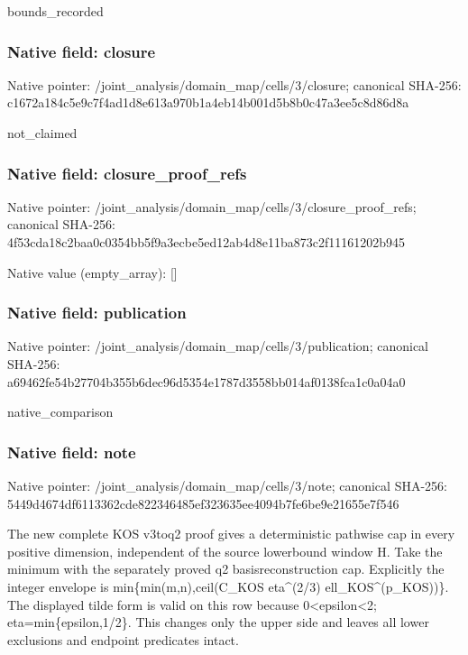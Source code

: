\documentclass[10pt,a4paper]{article}
\begin{document}
bounds\_recorded


\subsubsection{Native field: closure}


Native pointer: /joint\_analysis/domain\_m\allowbreak{}ap/cells/3/closure; canonical SHA-256: c1672a184c5e9c7f4ad1d8e6\allowbreak{}13a970b1a4eb14b001d5b8b0\allowbreak{}c47a3ee5c8d86d8a


not\_claimed


\subsubsection{Native field: closure\_proof\_refs}


Native pointer: /joint\_analysis/domain\_m\allowbreak{}ap/cells/3/closure\_proof\allowbreak{}\_refs; canonical SHA-256: 4f53cda18c2baa0c0354bb5f\allowbreak{}9a3ecbe5ed12ab4d8e11ba87\allowbreak{}3c2f11161202b945



Native value (empty\_array): []



\subsubsection{Native field: publication}


Native pointer: /joint\_analysis/domain\_m\allowbreak{}ap/cells/3/publication; canonical SHA-256: a69462fe54b27704b355b6de\allowbreak{}c96d5354e1787d3558bb014a\allowbreak{}f0138fca1c0a04a0


native\_comparison


\subsubsection{Native field: note}


Native pointer: /joint\_analysis/domain\_map/cells/3/note; canonical SHA-256: 5449d4674df6113362cde822\allowbreak{}346485ef323635ee4094b7fe\allowbreak{}6be9e21655e7f546


The new complete KOS v3toq2 proof gives a deterministic pathwise cap in every positive dimension, independent of the source lowerbound window H. Take the minimum with the separately proved q2 basisreconstruction cap. Explicitly the integer envelope is min\{min(m,n),ceil(C\_KOS eta\textasciicircum{}(2/3) ell\_KOS\textasciicircum{}(p\_KOS))\}. The displayed tilde form is valid on this row because 0<epsilon<2; eta=min\{epsilon,1/2\}. This changes only the upper side and leaves all lower exclusions and endpoint predicates intact.
\end{document}
